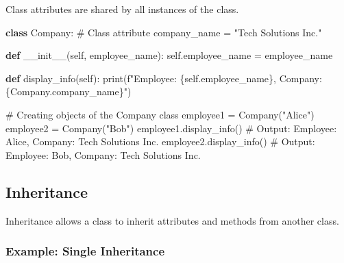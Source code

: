 \documentclass[
  letterpaper,
  DIV=11,
  numbers=noendperiod]{scrreprt}
\newenvironment{Shaded}{\begin{snugshade}}{\end{snugshade}}
\newcommand{\BuiltInTok}[1]{\textcolor[rgb]{0.00,0.23,0.31}{#1}}
\newcommand{\CommentTok}[1]{\textcolor[rgb]{0.37,0.37,0.37}{#1}}
\newcommand{\FunctionTok}[1]{\textcolor[rgb]{0.28,0.35,0.67}{#1}}
\newcommand{\KeywordTok}[1]{\textcolor[rgb]{0.00,0.23,0.31}{\textbf{#1}}}
\newcommand{\NormalTok}[1]{\textcolor[rgb]{0.00,0.23,0.31}{#1}}
\newcommand{\OperatorTok}[1]{\textcolor[rgb]{0.37,0.37,0.37}{#1}}
\newcommand{\SpecialCharTok}[1]{\textcolor[rgb]{0.37,0.37,0.37}{#1}}
\newcommand{\SpecialStringTok}[1]{\textcolor[rgb]{0.13,0.47,0.30}{#1}}
\newcommand{\StringTok}[1]{\textcolor[rgb]{0.13,0.47,0.30}{#1}}
\newcommand{\VariableTok}[1]{\textcolor[rgb]{0.07,0.07,0.07}{#1}}
\begin{document}
Class attributes are shared by all instances of the class.

\begin{Shaded}
\begin{Highlighting}[]
\KeywordTok{class}\NormalTok{ Company:}
    \CommentTok{\# Class attribute}
\NormalTok{    company\_name }\OperatorTok{=} \StringTok{"Tech Solutions Inc."}
    
    \KeywordTok{def} \FunctionTok{\_\_init\_\_}\NormalTok{(}\VariableTok{self}\NormalTok{, employee\_name):}
        \VariableTok{self}\NormalTok{.employee\_name }\OperatorTok{=}\NormalTok{ employee\_name}
    
    \KeywordTok{def}\NormalTok{ display\_info(}\VariableTok{self}\NormalTok{):}
        \BuiltInTok{print}\NormalTok{(}\SpecialStringTok{f"Employee: }\SpecialCharTok{\{}\VariableTok{self}\SpecialCharTok{.}\NormalTok{employee\_name}\SpecialCharTok{\}}\SpecialStringTok{, Company: }\SpecialCharTok{\{}\NormalTok{Company}\SpecialCharTok{.}\NormalTok{company\_name}\SpecialCharTok{\}}\SpecialStringTok{"}\NormalTok{)}

\CommentTok{\# Creating objects of the Company class}
\NormalTok{employee1 }\OperatorTok{=}\NormalTok{ Company(}\StringTok{"Alice"}\NormalTok{)}
\NormalTok{employee2 }\OperatorTok{=}\NormalTok{ Company(}\StringTok{"Bob"}\NormalTok{)}
\NormalTok{employee1.display\_info()  }\CommentTok{\# Output: Employee: Alice, Company: Tech Solutions Inc.}
\NormalTok{employee2.display\_info()  }\CommentTok{\# Output: Employee: Bob, Company: Tech Solutions Inc.}
\end{Highlighting}
\end{Shaded}

\subsection{Inheritance}\label{inheritance}

Inheritance allows a class to inherit attributes and methods from
another class.

\subsubsection{Example: Single
Inheritance}\label{example-single-inheritance}
\end{document}
